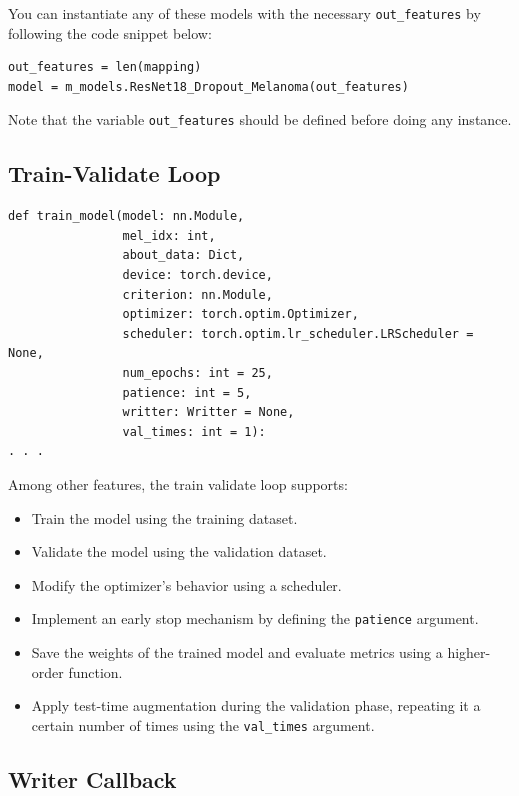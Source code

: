 You can instantiate any of these models with the necessary {\tt out\_features}
by following the code snippet below:

\begin{Verbatim}[fontsize=\scriptsize]
out_features = len(mapping)
model = m_models.ResNet18_Dropout_Melanoma(out_features)
\end{Verbatim}

Note that the variable {\tt out\_features} should be defined before doing any
instance.

\subsection{Train-Validate Loop}

\begin{Verbatim}[fontsize=\scriptsize]
def train_model(model: nn.Module,
                mel_idx: int,
                about_data: Dict,
                device: torch.device,
                criterion: nn.Module,
                optimizer: torch.optim.Optimizer,
                scheduler: torch.optim.lr_scheduler.LRScheduler = None,
                num_epochs: int = 25,
                patience: int = 5,
                writter: Writter = None,
                val_times: int = 1):
. . .
\end{Verbatim}

Among other features, the train validate loop supports:

\begin{itemize}
  \item Train the model using the training dataset.
  \item Validate the model using the validation dataset.
  \item Modify the optimizer's behavior using a scheduler.
  \item Implement an early stop mechanism by defining the {\tt patience} argument.
  \item Save the weights of the trained model and evaluate metrics using a higher-order function.
  \item Apply test-time augmentation during the validation phase, repeating it a certain number of times using the {\tt val\_times} argument.
\end{itemize}

\subsection{Writer Callback}

